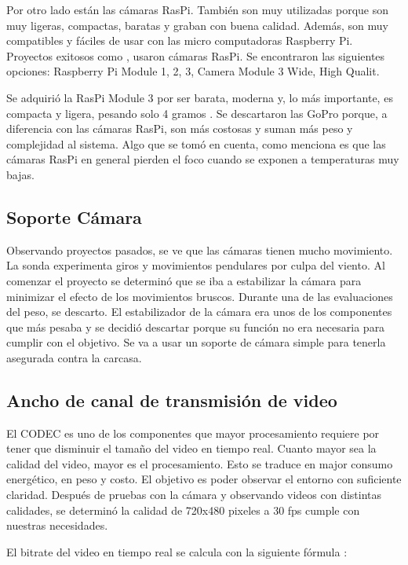 \documentclass[12pt,a4paper]{article}
\begin{document}
Por otro lado están las cámaras RasPi. También son muy utilizadas porque son muy ligeras, compactas, baratas y graban con buena calidad. Además, son muy compatibles y fáciles de usar con las micro computadoras Raspberry Pi. Proyectos exitosos como \cite{ref2,ref17,ref21,ref22}, usaron cámaras RasPi. Se encontraron las siguientes opciones: Raspberry Pi Module 1, 2, 3, Camera Module 3 Wide, High Qualit.

Se adquirió la RasPi Module 3 por ser barata, moderna y, lo más importante, es compacta y ligera, pesando solo 4 gramos \cite{ref23}. Se descartaron las GoPro porque, a diferencia con las cámaras RasPi, son más costosas y suman más peso y complejidad al sistema. Algo que se tomó en cuenta, como menciona \cite{ref24} es que las cámaras RasPi en general pierden el foco cuando se exponen a temperaturas muy bajas.

\subsection{Soporte Cámara}\label{soporte-cuxe1mara}

Observando proyectos pasados, se ve que las cámaras tienen mucho movimiento. La sonda experimenta giros y movimientos pendulares por culpa del viento. Al comenzar el proyecto se determinó que se iba a estabilizar la cámara para minimizar el efecto de los movimientos bruscos. Durante una de las evaluaciones del peso, se descarto. El estabilizador de la cámara era unos de los componentes que más pesaba y se decidió descartar porque su función no era necesaria para cumplir con el objetivo. Se va a usar un soporte de cámara simple para tenerla asegurada contra la carcasa.

\subsection{Ancho de canal de transmisión de video}\label{ancho-de-canal-transmisiuxf3n-de-video}

El CODEC es uno de los componentes que mayor procesamiento requiere por tener que disminuir el tamaño del video en tiempo real. Cuanto mayor sea la calidad del video, mayor es el procesamiento. Esto se traduce en major consumo energético, en peso y costo. El objetivo es poder observar el entorno con suficiente claridad. Después de pruebas con la cámara y observando videos con distintas calidades, se determinó la calidad de 720x480 pixeles a 30 fps cumple con nuestras necesidades.

El bitrate del video en tiempo real se calcula con la siguiente fórmula \cite{ref45}:
\end{document}
